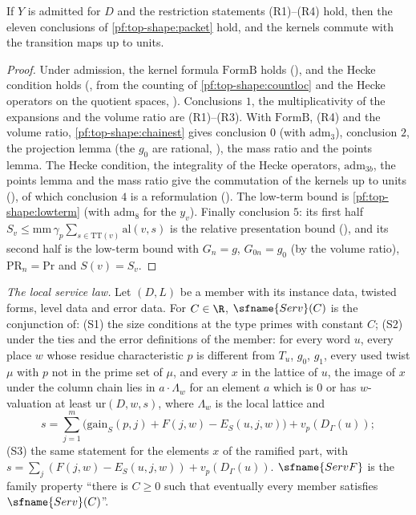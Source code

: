 \begin{theorem}\label{pf:top-shape:prv}
If $Y$ is admitted for $D$ and the restriction statements (R1)--(R4) hold, then the eleven conclusions of
\cref{pf:top-shape:packet} hold, and the kernels commute with the transition maps up to units.
\end{theorem}

\begin{proof}
Under admission, the kernel formula $\mathrm{FormB}$ holds (),
and the Hecke condition holds
(, from the counting of
\cref{pf:top-shape:countloc} and the Hecke operators on the quotient spaces,
). Conclusions $1$, the multiplicativity of the
expansions and the volume ratio are (R1)--(R3). With $\mathrm{FormB}$, (R4) and the volume ratio,
\cref{pf:top-shape:chainest} gives conclusion $0$ (with $\mathrm{adm}_3$), conclusion $2$, the projection lemma (the
$g_0$ are rational, ), the mass ratio and the points
lemma. The Hecke condition, the integrality of the Hecke operators, $\mathrm{adm}_{3b}$, the points lemma and the mass
ratio give the commutation of the kernels up to units
(), of which conclusion $4$ is a
reformulation (). The low-term bound is
\cref{pf:top-shape:lowterm} (with $\mathrm{adm}_8$ for the $y_v$). Finally conclusion $5$: its first half
$S_v\le\mathrm{mm}\,\gamma_p\sum_{s\in\mathrm{TT}(v)}\mathrm{al}(v,s)$ is the relative presentation bound
(), and its second half is the
low-term bound with $G_n=g$, $G_{0n}=g_0$ (by the volume ratio), $\mathrm{PR}_n=\mathrm{Pr}$ and $S(v)=S_v$.
\end{proof}

\emph{The local service law.} Let $(D,L)$ be a member with its instance data, twisted forms, level data and error data.
For $C\in\R$, $\sfname{Serv}(C)$ is the conjunction of: (S1) the size conditions at the type primes with constant
$C$; (S2) under the ties and the error definitions of the member: for every word $u$, every place $w$ whose residue
characteristic $p$ is different from $T_u$, $g_0$, $g_1$, every used twist $\mu$ with $p$ not in the prime set of
$\mu$, and every $x$ in the lattice of $u$, the image of $x$ under the column chain lies in $a\cdot\Lambda_w$ for an
element $a$ which is $0$ or has $w$-valuation at least $\mathrm{ur}(D,w,s)$, where $\Lambda_w$ is the local lattice and
\[
s=\sum_{j=1}^m\bigl(\mathrm{gain}_S(p,j)+F(j,w)-E_S(u,j,w)\bigr)+v_p(D_\Gamma(u));
\]
(S3) the same statement for the elements $x$ of the ramified part, with $s=\sum_j(F(j,w)-E_S(u,j,w))+v_p(D_\Gamma(u))$.
$\sfname{ServF}$ is the family property ``there is $C\ge0$ such that eventually every member satisfies
$\sfname{Serv}(C)$''.

